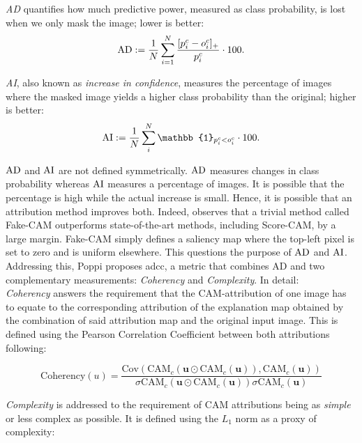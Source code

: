 \noindent \emph{AD} quantifies how much predictive power, measured as class probability, 
is lost when we only mask the image; lower is better:
\begin{equation}
	\operatorname{AD} \mathrel{:=} \frac{1}{N} \sum_{i=1}^N \frac{[p^c_i - o^c_i]_+}{p^c_i} \cdot 100.
\label{eq:ad}
\end{equation}

\noindent \emph{AI}, also known as \emph{increase in confidence}, measures the 
percentage of images where the masked image yields a higher class probability than the original; 
higher is better:
\begin{equation}
	\AI \defn \frac{1}{N} \sum_i^N \mathbb{1}_{p^c_i < o^c_i} \cdot 100.
\label{eq:ai}
\end{equation}

$\operatorname{AD}$ and $\operatorname{AI}$ are not defined symmetrically. $\operatorname{AD}$ measures changes in class probability 
whereas $\operatorname{AI}$ measures a percentage of images. It is possible that the percentage is high while 
the actual increase is small. Hence, it is possible that an attribution method improves both. 
Indeed, \autocite{poppi2021revisiting} observes that a trivial method called Fake-CAM outperforms 
state-of-the-art methods, including Score-CAM, by a large margin. Fake-CAM simply defines a 
saliency map where the top-left pixel is set to zero and is uniform elsewhere. 
This questions the purpose of $\operatorname{AD}$ and $\operatorname{AI}$. Addressing this, Poppi proposes \gls{adcc}, a metric 
that combines AD and two complementary measurements: \emph{Coherency} and \emph{Complexity}.
In detail:\\

\noindent \emph{Coherency} answers the requirement that the CAM-attribution of one image has to 
equate to the corresponding attribution of the explanation map obtained by the combination of said 
attribution map and the original input image. This is defined using the Pearson Correlation 
Coefficient between both attributions following:

\begin{equation}
	\mbox{Coherency}(u) = \frac{\mbox{Cov}\left(\mbox{CAM}_c(\mathbf{u}\odot \mbox{CAM}_c(\mathbf{u})),
	                       \mbox{CAM}_c(\mathbf{u})\right)}{\sigma\mbox{CAM}_c(\mathbf{u}
						   \odot \mbox{CAM}_c(\mathbf{u}))\sigma\mbox{CAM}_c(\mathbf{u})}
\end{equation}

\noindent\emph{Complexity} is addressed to the requirement of CAM attributions being as 
\emph{simple} or less complex as possible. It is defined using the $L_1$ norm as a proxy of 
complexity:

